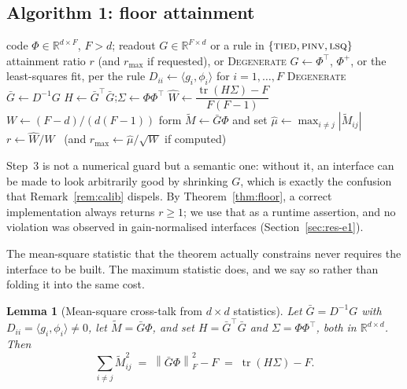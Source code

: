 \documentclass[preprint,12pt]{elsarticle}
\newtheorem{lemma}[theorem]{Lemma}
\theoremstyle{definition}
\newcommand{\R}{\mathbb{R}}
\newcommand{\norm}[1]{\left\lVert #1 \right\rVert}
\begin{document}
\subsection{Algorithm 1: floor attainment}

\begin{algorithm}[t]
\caption{\textsc{FloorAttainment} --- how close the readout interface sits to the floor}
\label{alg:one}
\begin{algorithmic}[1]
\Require code $\Phi\in\R^{d\times F}$, $F>d$; readout $G\in\R^{F\times d}$ or a rule in
  $\{\textsc{tied},\textsc{pinv},\textsc{lsq}\}$
\Ensure attainment ratio $r$ (and $r_{\max}$ if requested), or \textsc{Degenerate}
\State $G\gets\Phi^{\top}$, $\Phi^{+}$, or the least-squares fit, per the rule
\State $D_{ii}\gets\langle g_i,\phi_i\rangle$ for $i=1,\dots,F$
 \Return \textsc{Degenerate}
\EndIf
\State $\bar G\gets D^{-1}G$ 
\State $H\gets\bar G^{\top}\bar G$;\quad $\Sigma\gets\Phi\Phi^{\top}$
\State $\widehat W\gets\dfrac{\operatorname{tr}(H\Sigma)-F}{F(F-1)}$
\State $W\gets(F-d)/(d(F-1))$ 
  \State form $\widetilde M\gets\bar G\Phi$ and set
    $\widehat\mu\gets\max_{i\neq j}|\widetilde M_{ij}|$
\EndIf
\State \Return $r\gets\widehat W/W$ \ (and $r_{\max}\gets\widehat\mu/\sqrt{W}$ if computed)
\end{algorithmic}
\end{algorithm}

Step~3 is not a numerical guard but a semantic one: without it, an interface can be made to
look arbitrarily good by shrinking $G$, which is exactly the confusion that
Remark~\ref{rem:calib} dispels. By Theorem~\ref{thm:floor}, a correct implementation always
returns $r\ge1$; we use that as a runtime assertion, and no violation was observed in
\EoneMeasurements{} gain-normalised interfaces (Section~\ref{sec:res-e1}).

The mean-square statistic that the theorem actually constrains never requires the interface to
be built. The maximum statistic does, and we say so rather than folding it into the same cost.

\begin{lemma}[Mean-square cross-talk from $d\times d$ statistics]
\label{lem:suffstat}
Let $\bar G=D^{-1}G$ with $D_{ii}=\langle g_i,\phi_i\rangle\neq0$, let
$\widetilde M=\bar G\Phi$, and set $H=\bar G^{\top}\bar G$ and $\Sigma=\Phi\Phi^{\top}$, both
in $\R^{d\times d}$. Then
\[
  \sum_{i\neq j}\widetilde M_{ij}^{2}
  \;=\;\norm{\bar G\Phi}_F^{2}-F
  \;=\;\operatorname{tr}(H\Sigma)-F .
\]
\end{lemma}
\end{document}
